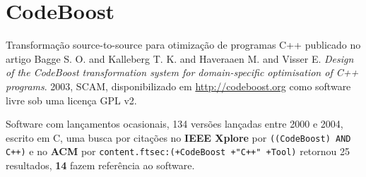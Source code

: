 \section{CodeBoost}

Transformação source-to-source para otimização de programas C++
publicado no artigo
Bagge S. O. and Kalleberg T. K. and Haveraaen M. and Visser E.
{\it Design of the CodeBoost transformation system for domain-specific optimisation of C++ programs}.
2003,
SCAM,
disponibilizado em \url{http://codeboost.org}
como software livre
sob uma licença GPL v2.

Software com lançamentos ocasionais,
134 versões lançadas
entre 2000 e 2004,
escrito em C,
uma busca por citações no {\bf IEEE Xplore} por
\texttt{((CodeBoost) AND C++)}
e no {\bf ACM} por
\texttt{content.ftsec:(+CodeBoost +"C++" +Tool)}
retornou
25 resultados,
{\bf 14} fazem referência ao software.

